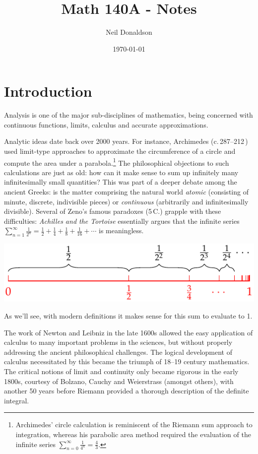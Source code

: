 \graphicspath{{1completeness/asy/}}

\title{Math 140A - Notes}
\author{Neil Donaldson}
\date{\today}
\maketitle

\thispagestyle{empty}


\section*{Introduction}

Analysis is one of the major sub-disciplines of mathematics, being concerned with continuous functions, limits, calculus and accurate approximations.
\smallbreak

Analytic ideas date back over 2000 years. For instance, Archimedes (c.\,287--212\,\BC) used limit-type approaches to approximate the circumference of a circle and compute the area under a parabola.\footnote{Archimedes' circle calculation is reminiscent of the Riemann sum approach to integration, whereas his parabolic area method required the evaluation of the infinite series $\sum_{n=0}^\infty \frac 1{4^n}=\frac 43$.}
The philosophical objections to such calculations are just as old: how can it make sense to sum up infinitely many infinitesimally small quantities? This was part of a deeper debate among the ancient Greeks: is the matter comprising the natural world \emph{atomic} (consisting of minute, discrete, indivisible pieces) or \emph{continuous} (arbitrarily and infinitesimally divisible). Several of Zeno's famous paradoxes (5\th\,C.{}\BC) grapple with these difficulties: \emph{Achilles and the Tortoise} essentially argues that the infinite series $\sum\limits_{n=1}^\infty \frac 1{2^n}=\frac 12+\frac 14+\frac 18+\frac 1{16}+\cdots$ is meaningless.
\begin{center}
	\includegraphics{zeno-jump}
\end{center}
As we'll see, with modern definitions it makes sense for this sum to evaluate to 1.
\smallbreak

The work of Newton and Leibniz in the late 1600s allowed the easy application of calculus to many important problems in the sciences, but without properly addressing the ancient philosophical challenges. The logical development of calculus necessitated by this became the triumph of 18\th--19\th{} century mathematics. The critical notions of limit and continuity only became rigorous in the early 1800s, courtesy of Bolzano, Cauchy and Weierstrass (amongst others), with another 50 years before Riemann provided a thorough description of the definite integral.
\medbreak

